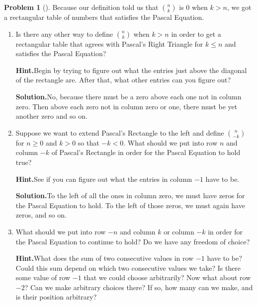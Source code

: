 \documentclass[10pt,]{book}
\theoremstyle{plain}
\theoremstyle{definition}
\newtheorem{activity}[project]{Problem}
\theoremstyle{definition}
\numberwithin{equation}{chapter}
\newcommand{\lt}{<}
\begin{document}
\begin{activity}[]\label{activity-32}
Because our definition told us that \(\binom{n}{k}\) is 0 when \(k>n\), we got a rectangular table of numbers that satisfies the Pascal Equation.%
\begin{enumerate}[font=\bfseries,label=(\alph*),ref=\alph*]
\item\label{task-25} Is there any other way to define \(\binom{n }{k}\) when \(k>n\) in order to get a rectangular table that agrees with Pascal's Right Triangle for \(k\le n\) and satisfies the Pascal Equation?%
\par\medskip\noindent%
\textbf{Hint.}\quad Begin by trying to figure out what the entries just above the diagonal of the rectangle are. After that, what other entries can you figure out?%
\par\medskip\noindent%
\textbf{Solution.}\quad No, because there must be a zero above each one not in column zero. Then above each zero not in column zero or one, there must be yet another zero and so on.%
\item\label{task-26} Suppose we want to extend Pascal's Rectangle to the left and define \(\binom{n}{-k}\) for \(n\ge 0\) and \(k>0\) so that \(-k\lt 0\). What should we put into row \(n\) and column \(-k\) of Pascal's Rectangle in order for the Pascal Equation to hold true?%
\par\medskip\noindent%
\textbf{Hint.}\quad See if you can figure out what the entries in column \(-1\) have to be.%
\par\medskip\noindent%
\textbf{Solution.}\quad To the left of all the ones in column zero, we must have zeros for the Pascal Equation to hold. To the left of those zeros, we must again have zeros, and so on.%
\item\label{task-27} What should we put into row \(-n\) and column \(k\) or column \(-k\) in order for the Pascal Equation to continue to hold?  Do we have any freedom of choice?%
\par\medskip\noindent%
\textbf{Hint.}\quad What does the sum of two consecutive values in row \(-1\) have to be? Could this sum depend on which two consecutive values we take? Is there some value of row \(-1\) that we could choose arbitrarily? Now what about row \(-2\)? Can we make arbitrary choices there? If so, how many can we make, and is their position arbitrary?%
\par\medskip\noindent%

\end{enumerate}
\end{activity}
\end{document}
